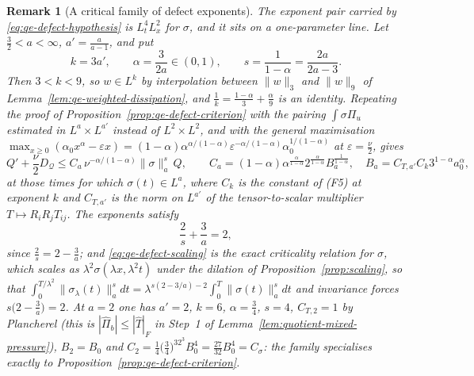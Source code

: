 \documentclass[11pt]{article}
\newtheorem{remark}[theorem]{Remark}
\theoremstyle{definition}
\theoremstyle{plain}
\newcommand{\norm}[1]{\lVert #1\rVert}
\begin{document}

\begin{remark}[A critical family of defect exponents]
\label{rem:qe-defect-family}
The exponent pair carried by \eqref{eq:qe-defect-hypothesis} is
$L^4_tL^2_x$ for $\sigma$, and it sits on a one-parameter line.  Let
$\frac32<a<\infty$, $a'=\frac a{a-1}$, and put
\[
 k=3a',\qquad \alpha=\frac3{2a}\in(0,1),
 \qquad s=\frac1{1-\alpha}=\frac{2a}{2a-3} .
\]
Then $3<k<9$, so $w\in L^k$ by interpolation between
$\norm w_3$ and $\norm w_9$ of
Lemma~\ref{lem:qe-weighted-dissipation}, and
$\frac1k=\frac{1-\alpha}3+\frac\alpha9$ is an identity.  Repeating the
proof of Proposition~\ref{prop:qe-defect-criterion} with the pairing
$\int\sigma\Pi_u$ estimated in $L^a\times L^{a'}$ instead of
$L^2\times L^2$, and with the general maximisation
$\max_{x\ge0}(\alpha_0x^\alpha-\varepsilon x)
=(1-\alpha)\alpha^{\alpha/(1-\alpha)}\varepsilon^{-\alpha/(1-\alpha)}
\alpha_0^{1/(1-\alpha)}$ at $\varepsilon=\frac\nu2$, gives
\[
 Q'+\frac\nu2D_{\mathcal Q}
 \le C_a\,\nu^{-\alpha/(1-\alpha)}\norm{\sigma}_a^s\,Q,
 \qquad
 C_a=(1-\alpha)\alpha^{\frac\alpha{1-\alpha}}2^{\frac\alpha{1-\alpha}}
 B_a^{\frac1{1-\alpha}},
 \quad
 B_a=C_{T,a'}C_k3^{1-\alpha}a_0^\alpha,
\]
at those times for which $\sigma(t)\in L^a$, where $C_k$ is the constant of
\textup{(F5)} at exponent $k$ and $C_{T,a'}$ is the norm on $L^{a'}$ of the
tensor-to-scalar multiplier $T\mapsto R_iR_jT_{ij}$.  The exponents satisfy
\begin{equation}\label{eq:qe-defect-scaling}
 \frac2s+\frac3a=2 ,
\end{equation}
since $\frac2s=2-\frac3a$; and \eqref{eq:qe-defect-scaling} is the exact
criticality relation for $\sigma$, which scales as
$\lambda^2\sigma(\lambda x,\lambda^2t)$ under the dilation of
Proposition~\ref{prop:scaling}, so that
$\int_0^{T/\lambda^2}\norm{\sigma_\lambda(t)}_a^sdt
=\lambda^{s(2-3/a)-2}\int_0^T\norm{\sigma(t)}_a^sdt$ and invariance forces
$s\bigl(2-\frac3a\bigr)=2$.  At $a=2$ one has $a'=2$, $k=6$,
$\alpha=\frac34$, $s=4$, $C_{T,2}=1$ by Plancherel (this is
$|\hat\Pi_b|\le|\hat T|_F$ in Step~1 of
Lemma~\ref{lem:quotient-mixed-pressure}), $B_2=B_0$ and
$C_2=\frac14\bigl(\frac34\bigr)^32^3B_0^4=\frac{27}{32}B_0^4=C_\sigma$: the
family specialises exactly to Proposition~\ref{prop:qe-defect-criterion}.


\end{remark}
\end{document}
